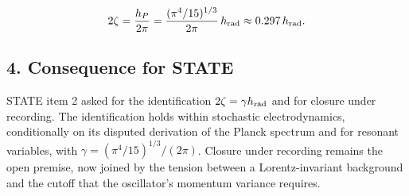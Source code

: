 \documentclass[11pt,a4paper]{article}
\begin{document}
\[2\zeta=\frac{h_P}{2\pi}=\frac{(\pi^4/15)^{1/3}}{2\pi}\,h_{\rm rad}\approx0.297\,h_{\rm rad}.\]

\hypertarget{consequence-for-state}{%
\subsection{4. Consequence for STATE}\label{consequence-for-state}}

STATE item 2 asked for the identification \(2\zeta=\gamma h_{\rm rad}\)
and for closure under recording. The identification holds within
stochastic electrodynamics, conditionally on its disputed derivation of
the Planck spectrum and for resonant variables, with
\(\gamma=(\pi^4/15)^{1/3}/(2\pi)\). Closure under recording remains the
open premise, now joined by the tension between a Lorentz-invariant
background and the cutoff that the oscillator's momentum variance
requires.
\end{document}
